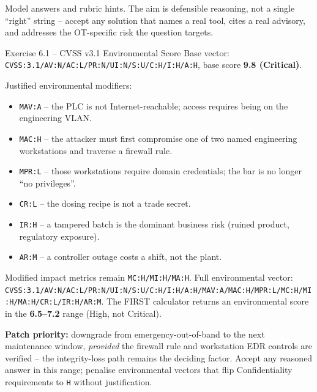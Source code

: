 \documentclass[11pt,a4paper]{article}
\begin{document}
\sheetheader

\noindent Model answers and rubric hints. The aim is defensible reasoning,
not a single ``right'' string -- accept any solution that names a real tool,
cites a real advisory, and addresses the OT-specific risk the question
targets.

\begin{taskbox}{Exercise 6.1 -- CVSS v3.1 Environmental Score}
Base vector: \texttt{CVSS:3.1/AV:N/AC:L/PR:N/UI:N/S:U/C:H/I:H/A:H}, base
score \textbf{9.8 (Critical)}.

Justified environmental modifiers:
\begin{itemize}
  \item \texttt{MAV:A} -- the PLC is not Internet-reachable; access
        requires being on the engineering VLAN.
  \item \texttt{MAC:H} -- the attacker must first compromise one of
        two named engineering workstations and traverse a firewall
        rule.
  \item \texttt{MPR:L} -- those workstations require domain
        credentials; the bar is no longer ``no privileges''.
  \item \texttt{CR:L} -- the dosing recipe is not a trade secret.
  \item \texttt{IR:H} -- a tampered batch is the dominant business
        risk (ruined product, regulatory exposure).
  \item \texttt{AR:M} -- a controller outage costs a shift, not the
        plant.
\end{itemize}
Modified impact metrics remain \texttt{MC:H/MI:H/MA:H}. Full
environmental vector:
\texttt{CVSS:3.1/AV:N/AC:L/PR:N/UI:N/S:U/C:H/I:H/A:H/\linebreak{}MAV:A/MAC:H/MPR:L/MC:H/MI:H/MA:H/CR:L/IR:H/AR:M}.
The FIRST calculator returns an environmental score in the
\textbf{6.5--7.2} range (High, not Critical).

\textbf{Patch priority:} downgrade from emergency-out-of-band to the
next maintenance window, \emph{provided} the firewall rule and
workstation EDR controls are verified -- the integrity-loss path
remains the deciding factor. Accept any reasoned answer in this
range; penalise environmental vectors that flip Confidentiality
requirements to \texttt{H} without justification.
\end{taskbox}
\end{document}
